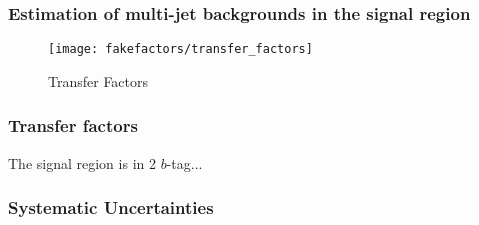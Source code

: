 \subsubsection{Estimation of multi-jet backgrounds in the signal region}


\begin{figure}[htbp]
  \centering

  \texttt{[image: fakefactors/transfer\_factors]}

  \caption{Transfer Factors}
  \label{fig:mjfakes_transfer_factor}
\end{figure}


\subsubsection{Transfer factors}

The signal region is in 2 $b$-tag...

%
%
%
%
%
%



\subsubsection{Systematic Uncertainties}






